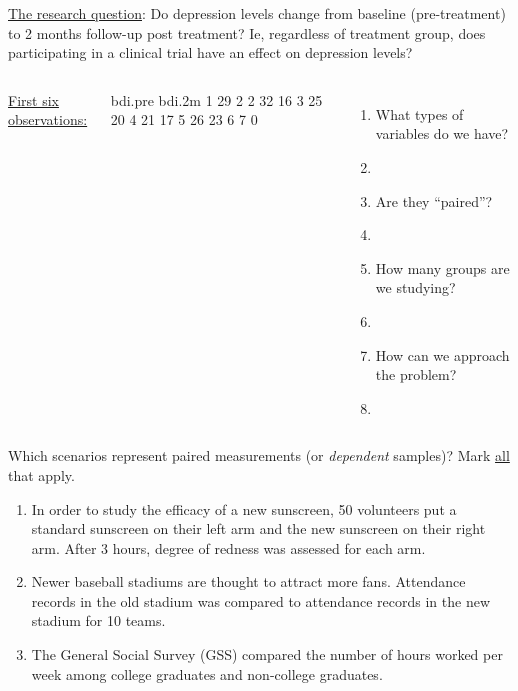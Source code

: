 \begin{frame}[fragile]
\underline{The research question}: Do depression levels change from baseline (pre-treatment) to 2 months follow-up post treatment? Ie, regardless of treatment group, does participating in a clinical trial have an effect on depression levels?
\vskip20pt
\begin{columns}
\underline{First six observations:}
\begin{lcverbatim}
  bdi.pre bdi.2m
1      29      2
2      32     16
3      25     20
4      21     17
5      26     23
6       7      0
\end{lcverbatim}
\begin{enumerate}
\item
What types of variables do we have?
\item[]
\item
Are they ``paired''?
\item[]
\item
How many groups are we studying?
\item[]
\item
How can we approach the problem?
\item[]
\end{enumerate}
\end{columns}
\end{frame}

\begin{frame}
\begin{clicker}{Which scenarios represent paired measurements (or \emph{dependent} samples)?  Mark \underline{all} that apply.}
\begin{enumerate}
    \item
    In order to study the efficacy of a new sunscreen, 50 volunteers put a standard sunscreen on their left arm and the new sunscreen on their right arm.  After 3 hours, degree of redness was assessed for each arm.
    \item
    Newer baseball stadiums are thought to attract more fans.  Attendance records in the old stadium was compared to attendance records in the new stadium for 10 teams.
    \item
    The General Social Survey (GSS) compared the number of hours worked per week among college graduates and non-college graduates.
\end{enumerate}
\end{clicker}
\end{frame}

